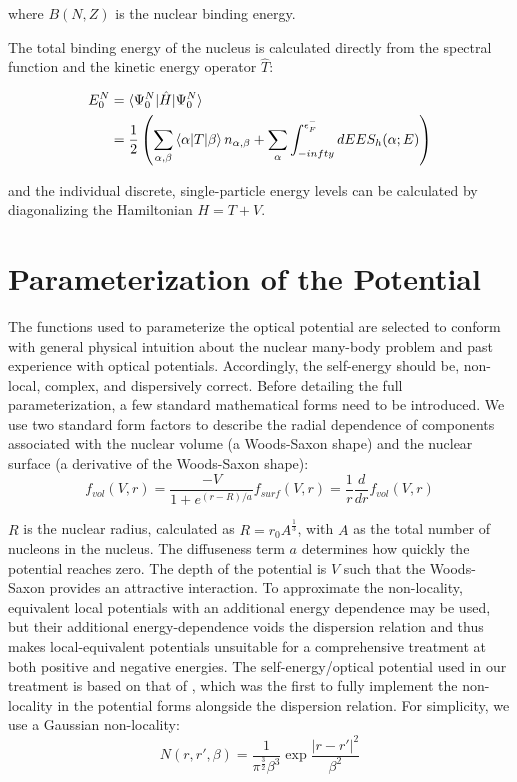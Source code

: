 \noindent
where $B(N,Z)$ is the nuclear binding energy.

The total binding energy of the nucleus is calculated directly from the spectral function and the
kinetic energy operator $\hat{T}$:

\begin{equation}
    \begin{split}
        E^{N}_{0} & = \braket{\Psi^{N}_{0}|\hat{H}|\Psi^{N}_{0}}\\
        & = \frac{1}{2} \left(\sum_{\alpha,\beta}\braket{\alpha|T|\beta}n_{\alpha,\beta}
        + \sum_{\alpha}\int_{-infty}^{\epsilon_{F}^{-}}dE E S_{h}(\alpha;E)\right)
    \end{split}
\end{equation}

\noindent
and the individual discrete, single-particle energy levels can be calculated by diagonalizing the
Hamiltonian $H = T + V$.

\section{Parameterization of the Potential}
The functions used to parameterize the optical potential
are selected to conform with general physical intuition about the nuclear
many-body problem and past experience with optical potentials. Accordingly,
the self-energy should be, non-local, complex, and dispersively correct.
Before detailing the full parameterization,
a few standard mathematical forms need to be introduced. We use two standard form factors
to describe the radial dependence of components
associated with the nuclear volume (a Woods-Saxon shape)
and the nuclear surface (a derivative of the Woods-Saxon shape):
\begin{equation} \label{WoodsSaxon}
    f_{vol}(V,r) = \frac{-V}{1+e^{(r-R)/a}}
    f_{surf}(V,r) = \frac{1}{r}\frac{d}{dr}f_{vol}(V,r)
\end{equation}

\noindent
$R$ is the nuclear radius, calculated as $R = r_{0}A^{\frac{1}{3}}$, with $A$ as the total number of
nucleons in the nucleus. The diffuseness term $a$ determines how quickly the potential reaches zero.
The depth of the potential is $V$ such that the Woods-Saxon
provides an attractive interaction.
To approximate the non-locality, equivalent local potentials \cite{Mahaux1991}
with an additional energy dependence may be used, but their additional energy-dependence
voids the dispersion relation and thus makes local-equivalent potentials unsuitable
for a comprehensive treatment at both positive and negative energies.
The self-energy/optical potential used in our treatment is based on that of
\cite{MahzoonPhDThesis}, which was the first to fully implement the non-locality in the potential
forms alongside the dispersion relation. For simplicity, we use a Gaussian non-locality:
\begin{equation}
    N(r, r',\beta) = \frac{1}{\pi^{\frac{3}{2}}\beta^{3}} \exp{\frac{|r-r'|^{2}}{\beta^{2}}}
\end{equation}

